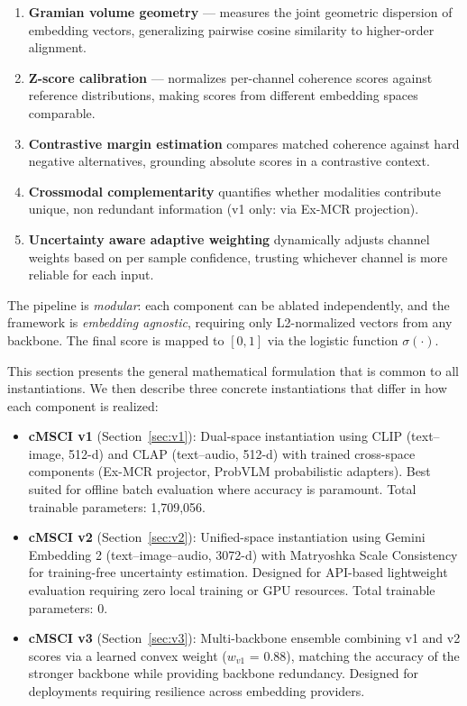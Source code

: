 \documentclass[a4paper,fleqn]{cas-sc}
\begin{document}
\begin{enumerate}
\item \textbf{Gramian volume geometry} --- measures the joint geometric dispersion of embedding vectors, generalizing pairwise cosine similarity to higher-order alignment.
\item \textbf{Z-score calibration} --- normalizes per-channel coherence scores against reference distributions, making scores from different embedding spaces comparable.
\item \textbf{Contrastive margin estimation} compares matched coherence against hard negative alternatives, grounding absolute scores in a contrastive context.
\item \textbf{Crossmodal complementarity} quantifies whether modalities contribute unique, non redundant information (v1 only: via Ex-MCR projection).
\item \textbf{Uncertainty aware adaptive weighting} dynamically adjusts channel weights based on per sample confidence, trusting whichever channel is more reliable for each input.
\end{enumerate}

The pipeline is \emph{modular}: each component can be ablated independently, and the framework is \emph{embedding agnostic}, requiring only L2-normalized vectors from any backbone. The final score is mapped to $[0, 1]$ via the logistic function $\sigma(\cdot)$.

This section presents the general mathematical formulation that is common to all instantiations. We then describe three concrete instantiations that differ in how each component is realized:

\begin{itemize}
\item \textbf{cMSCI v1} (Section~\ref{sec:v1}): Dual-space instantiation using CLIP (text--image, 512-d) and CLAP (text--audio, 512-d) with trained cross-space components (Ex-MCR projector, ProbVLM probabilistic adapters). Best suited for offline batch evaluation where accuracy is paramount. Total trainable parameters: 1,709,056.

\item \textbf{cMSCI v2} (Section~\ref{sec:v2}): Unified-space instantiation using Gemini Embedding 2 (text--image--audio, 3072-d) with Matryoshka Scale Consistency for training-free uncertainty estimation. Designed for API-based lightweight evaluation requiring zero local training or GPU resources. Total trainable parameters: 0.

\item \textbf{cMSCI v3} (Section~\ref{sec:v3}): Multi-backbone ensemble combining v1 and v2 scores via a learned convex weight ($w_{v1}$ = 0.88), matching the accuracy of the stronger backbone while providing backbone redundancy. Designed for deployments requiring resilience across embedding providers.
\end{itemize}
\end{document}
